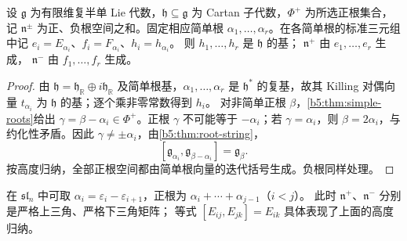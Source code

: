 \begin{proposition}\label{b5:prop:root-bracket-generation}
	设 \(\mathfrak g\) 为有限维复半单 Lie 代数，\(\mathfrak h\subseteq\mathfrak g\) 为 Cartan 子代数，\(\Phi^+\) 为所选正根集合，记 \(\mathfrak n^\pm\) 为正、负根空间之和。固定相应简单根 \(\alpha_1,\ldots,\alpha_r\)。在各简单根的标准三元组中记 \(e_i=E_{\alpha_i}\)、\(f_i=F_{\alpha_i}\)、\(h_i=h_{\alpha_i}\)。 则 \(h_1,\ldots,h_r\) 是 \(\mathfrak h\) 的基； \(\mathfrak n^+\) 由 \(e_1,\ldots,e_r\) 生成， \(\mathfrak n^-\) 由 \(f_1,\ldots,f_r\) 生成。
\end{proposition}
\begin{proof}
	由 \(\mathfrak h=\mathfrak h_{\mathbb R}\oplus i\mathfrak h_{\mathbb R}\) 及简单根基，\(\alpha_1,\ldots,\alpha_r\) 是 \(\mathfrak h^*\) 的复基，故其 Killing 对偶向量 \(t_{\alpha_i}\) 为 \(\mathfrak h\) 的基；逐个乘非零常数得到 \(h_i\)。 对非简单正根 \(\beta\)，\cref{b5:thm:simple-roots}给出 \(\gamma=\beta-\alpha_i\in\Phi^+\)。正根 \(\gamma\) 不可能等于 \(-\alpha_i\)；若 \(\gamma=\alpha_i\)，则 \(\beta=2\alpha_i\)，与约化性矛盾。因此 \(\gamma\ne\pm\alpha_i\)，由\cref{b5:thm:root-string}，
	\[
		[\mathfrak g_{\alpha_i},\mathfrak g_{\beta-\alpha_i}] =\mathfrak g_\beta.
	\]
	按高度归纳，全部正根空间都由简单根向量的迭代括号生成。负根同样处理。
\end{proof}

在 \(\mathfrak{sl}_n\) 中可取 \(\alpha_i=\varepsilon_i-\varepsilon_{i+1}\)，正根为 \(\alpha_i+\cdots+\alpha_{j-1}\)（\(i<j\)）。 此时 \(\mathfrak n^+\)、\(\mathfrak n^-\) 分别是严格上三角、严格下三角矩阵； 等式 \([E_{ij},E_{jk}]=E_{ik}\) 具体表现了上面的高度归纳。

